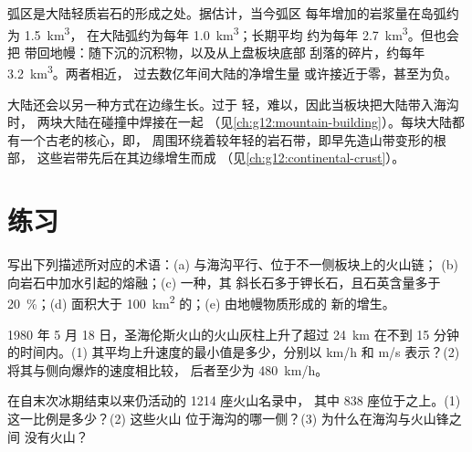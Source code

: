 弧区是大陆轻质岩石的形成之处。据估计，当今弧区
每年增加的岩浆量在岛弧约为 \qty{1.5}{km^3}，
在大陆弧约为每年 \qty{1.0}{km^3}；长期平均
约为每年 \qty{2.7}{km^3}。但也会把
带回地幔：随下沉的沉积物，以及从上盘板块底部
刮落的碎片，约每年 \qty{3.2}{km^3}。两者相近，
过去数亿年间大陆的净增生量
或许接近于零，甚至为负。

大陆还会以另一种方式在边缘生长。过于
轻，难以，因此当板块把大陆带入海沟时，
两块大陆在碰撞中焊接在一起
（见\cref{ch:g12:mountain-building}）。每块大陆都有一个古老的核心，即，
周围环绕着较年轻的岩石带，即早先造山带变形的根部，
这些岩带先后在其边缘增生而成
（见\cref{ch:g12:continental-crust}）。

\section{练习}

\begin{exercise}[$\star$]\label{exo:g12:subduction-magmatism:1}
写出下列描述所对应的术语：(a) 与海沟平行、位于不一侧板块上的火山链；
(b) 向岩石中加水引起的熔融；(c) 一种，其
斜长石多于钾长石，且石英含量多于
\qty{20}{\percent}；(d) 面积大于
\qty{100}{km^2} 的；(e) 由地幔物质形成的
新的增生。
\end{exercise}

\begin{exercise}[$\star$]\label{exo:g12:subduction-magmatism:2}
1980 年 5 月 18 日，圣海伦斯火山的火山灰柱上升了超过 \qty{24}{km}
在不到 15 分钟的时间内。(1) 其平均上升速度的最小值是多少，分别以
\unit{km/h} 和 \unit{m/s} 表示？(2) 将其与侧向爆炸的速度相比较，
后者至少为 \qty{480}{km/h}。
\end{exercise}

\begin{exercise}[$\star$]\label{exo:g12:subduction-magmatism:3}
在自末次冰期结束以来仍活动的 1214 座火山名录中，
其中 838 座位于之上。(1) 这一比例是多少？(2) 这些火山
位于海沟的哪一侧？(3) 为什么在海沟与火山锋之间
没有火山？
\end{exercise}

